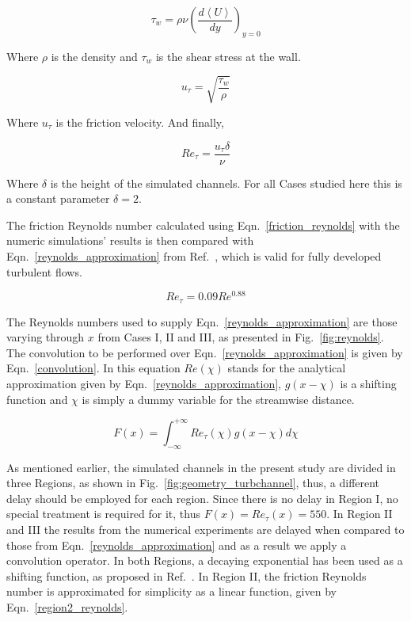 \documentclass[twocolumn,10pt]{asme2e}
\begin{document}
\begin{equation}
{\tau}_w = \rho\nu\left(\frac{d\left<U\right>}{dy}\right)_{y=0}
\label{shear_wall}
\end{equation}

Where \(\rho\) is the density and \({\tau}_w\)  is the shear stress at the wall.

\begin{equation}
u_{\tau} = \sqrt{\frac{{\tau}_w}{\rho}}
\label{u_t}
\end{equation}

Where \(u_{\tau}\) is the friction velocity. And finally,

\begin{equation}
Re_{\tau} = \frac{u_{\tau}\delta}{\nu}
\label{friction_reynolds}
\end{equation}

Where \(\delta\) is the height of the simulated channels. For all Cases studied here this is a constant parameter \(\delta=2\).

The friction Reynolds number calculated using Eqn.~\ref{friction_reynolds} with the numeric simulations' results is then compared with Eqn.~\ref{reynolds_approximation} from Ref.~\cite{pope}, which is valid for fully developed turbulent flows.

\begin{equation}
Re_{\tau} = 0.09Re^{0.88}
\label{reynolds_approximation}
\end{equation}

The Reynolds numbers used to supply Eqn.~\ref{reynolds_approximation} are those varying through \(x\) from Cases I, II and III, as presented in Fig.~\ref{fig:reynolds}. The convolution to be performed over Eqn.~\ref{reynolds_approximation} is given by Eqn.~\ref{convolution}. In this equation \(Re(\chi)\) stands for the analytical approximation given by Eqn.~\ref{reynolds_approximation}, \(g(x-\chi)\)  is a shifting function and \(\chi\) is simply a dummy variable for the streamwise distance.

\begin{equation}
F(x) =  \int_{-\infty}^{+\infty} Re_{\tau}(\chi)g(x-\chi)d\chi
\label{convolution}
\end{equation}

As mentioned earlier, the simulated channels in the present study are divided in three Regions, as shown in Fig.~\ref{fig:geometry_turbchannel}, thus, a different delay should be employed for each region. Since there is no delay in Region I, no special treatment is required for it, thus \(F(x)=Re_{\tau}(x)=550\). In Region II and III the results from the numerical experiments are delayed when compared to those from Eqn.~\ref{reynolds_approximation} and as a result we apply a convolution operator. In both Regions, a decaying exponential has been used as a shifting function, as proposed in Ref.~\cite{signals}. In Region II, the friction Reynolds number is approximated for simplicity as a linear function, given by Eqn.~\ref{region2_reynolds}.
\end{document}
